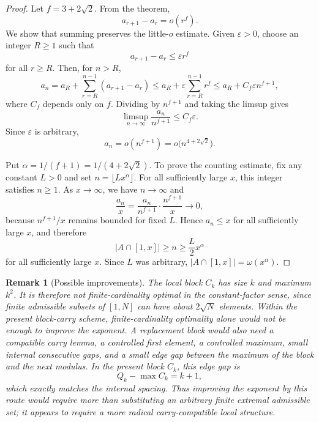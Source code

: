 \documentclass[11pt]{article}
\newtheorem{remark}{Remark}
\begin{document}
\begin{proof}
Let $f=3+2\sqrt2$.  From the theorem,
\[
        a_{r+1}-a_r=o(r^f).
\]
We show that summing preserves the little-$o$ estimate.  Given $\varepsilon>0$, choose an integer $R\ge1$ such that
\[
        a_{r+1}-a_r\le \varepsilon r^f
\]
for all $r\ge R$.  Then, for $n>R$,
\[
        a_n
        =a_R+\sum_{r=R}^{n-1}(a_{r+1}-a_r)
        \le
        a_R+\varepsilon\sum_{r=R}^{n-1}r^f
        \le
        a_R+C_f\varepsilon n^{f+1},
\]
where $C_f$ depends only on $f$.  Dividing by $n^{f+1}$ and taking the limsup gives
\[
        \limsup_{n\to\infty}\frac{a_n}{n^{f+1}}\le C_f\varepsilon.
\]
Since $\varepsilon$ is arbitrary,
\[
        a_n=o(n^{f+1})=o\bigl(n^{4+2\sqrt2}\bigr).
\]

Put $\alpha=1/(f+1)=1/(4+2\sqrt2)$.  To prove the counting estimate, fix any constant $L>0$ and set $n=\lfloor Lx^\alpha\rfloor$.  For all sufficiently large $x$, this integer satisfies $n\ge1$.  As $x\to\infty$, we have $n\to\infty$ and
\[
        \frac{a_n}{x}
        =
        \frac{a_n}{n^{f+1}}\cdot\frac{n^{f+1}}{x}
        \longrightarrow 0,
\]
because $n^{f+1}/x$ remains bounded for fixed $L$.  Hence $a_n\le x$ for all sufficiently large $x$, and therefore
\[
        |A\cap[1,x]|\ge n\ge \frac L2 x^\alpha
\]
for all sufficiently large $x$.  Since $L$ was arbitrary, $|A\cap[1,x]|=\omega(x^\alpha)$.
\end{proof}

\begin{remark}[Possible improvements]\label{rem:improvements}
The local block $C_k$ has size $k$ and maximum $k^2$.  It is therefore not finite-cardinality optimal in the constant-factor sense, since finite admissible subsets of $[1,N]$ can have about $2\sqrt N$ elements.  Within the present block-carry scheme, finite-cardinality optimality alone would not be enough to improve the exponent.  A replacement block would also need a compatible carry lemma, a controlled first element, a controlled maximum, small internal consecutive gaps, and a small edge gap between the maximum of the block and the next modulus.  In the present block $C_k$, this edge gap is
\[
        Q_k-\max C_k=k+1,
\]
which exactly matches the internal spacing.  Thus improving the exponent by this route would require more than substituting an arbitrary finite extremal admissible set; it appears to require a more radical carry-compatible local structure.
\end{remark}
\end{document}
